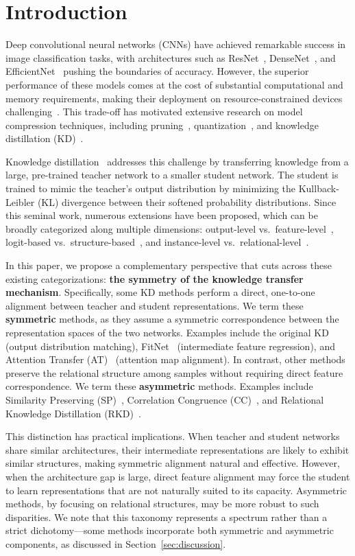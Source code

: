 \documentclass[symmetry,article,submit,moreauthors]{Definitions/mdpi}
\begin{document}
\section{Introduction}

Deep convolutional neural networks (CNNs) have achieved remarkable success in image classification tasks, with architectures such as ResNet~\cite{ref1}, DenseNet~\cite{ref2}, and EfficientNet~\cite{ref3} pushing the boundaries of accuracy. However, the superior performance of these models comes at the cost of substantial computational and memory requirements, making their deployment on resource-constrained devices challenging~\cite{ref4}. This trade-off has motivated extensive research on model compression techniques, including pruning~\cite{ref5}, quantization~\cite{ref6}, and knowledge distillation (KD)~\cite{ref7}.

Knowledge distillation~\cite{ref7} addresses this challenge by transferring knowledge from a large, pre-trained teacher network to a smaller student network. The student is trained to mimic the teacher's output distribution by minimizing the Kullback-Leibler (KL) divergence between their softened probability distributions. Since this seminal work, numerous extensions have been proposed, which can be broadly categorized along multiple dimensions: output-level vs.\ feature-level~\cite{ref8,ref9}, logit-based vs.\ structure-based~\cite{ref10,ref11}, and instance-level vs.\ relational-level~\cite{ref12}.

In this paper, we propose a complementary perspective that cuts across these existing categorizations: \textbf{the symmetry of the knowledge transfer mechanism}. Specifically, some KD methods perform a direct, one-to-one alignment between teacher and student representations. We term these \textbf{symmetric} methods, as they assume a symmetric correspondence between the representation spaces of the two networks. Examples include the original KD (output distribution matching), FitNet~\cite{ref8} (intermediate feature regression), and Attention Transfer (AT)~\cite{ref9} (attention map alignment). In contrast, other methods preserve the relational structure among samples without requiring direct feature correspondence. We term these \textbf{asymmetric} methods. Examples include Similarity Preserving (SP)~\cite{ref10}, Correlation Congruence (CC)~\cite{ref11}, and Relational Knowledge Distillation (RKD)~\cite{ref12}.

This distinction has practical implications. When teacher and student networks share similar architectures, their intermediate representations are likely to exhibit similar structures, making symmetric alignment natural and effective. However, when the architecture gap is large, direct feature alignment may force the student to learn representations that are not naturally suited to its capacity. Asymmetric methods, by focusing on relational structures, may be more robust to such disparities. We note that this taxonomy represents a spectrum rather than a strict dichotomy---some methods incorporate both symmetric and asymmetric components, as discussed in Section~\ref{sec:discussion}.
\end{document}
